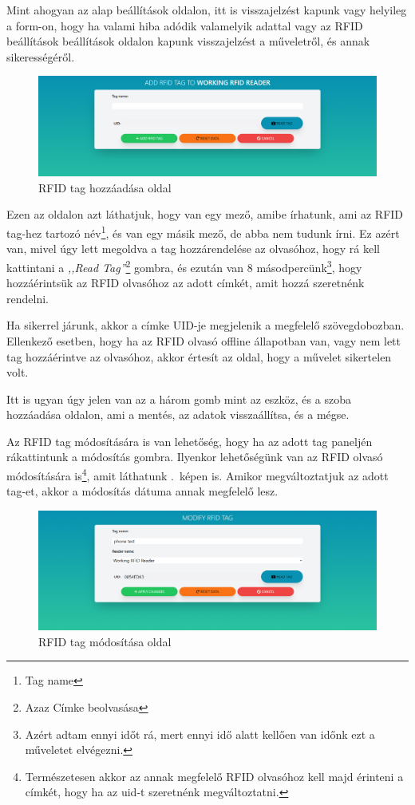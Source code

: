 \documentclass[
]{thesis-ekf}
\theoremstyle{definition}
\theoremstyle{remark}
\begin{document}
	Mint ahogyan az alap beállítások oldalon, itt is visszajelzést kapunk vagy helyileg a form-on, hogy ha valami hiba adódik valamelyik adattal vagy az RFID beállítások beállítások oldalon kapunk visszajelzést a műveletről, és annak sikerességéről.
	
	\begin{figure}[ht!]
		\centering
		\includegraphics[width=1\textwidth]{./src/pages_img/add-rfid-tag}
		\caption{RFID tag hozzáadása oldal}
		\label{add-rfid-tag}
	\end{figure}

	Ezen az oldalon azt láthatjuk, hogy van egy mező, amibe írhatunk, ami az RFID tag-hez tartozó név\footnote{Tag name}, és van egy másik mező, de abba nem tudunk írni. Ez azért van, mivel úgy lett megoldva a tag hozzárendelése az olvasóhoz, hogy rá kell kattintani a \emph{,,Read Tag''}\footnote{Azaz Címke beolvasása} gombra, és ezután van 8 másodpercünk\footnote{Azért adtam ennyi időt rá, mert ennyi idő alatt kellően van időnk ezt a műveletet elvégezni.}, hogy hozzáérintsük az RFID olvasóhoz az adott címkét, amit hozzá szeretnénk rendelni. 
	
	Ha sikerrel járunk, akkor a címke UID-je megjelenik a megfelelő szövegdobozban. Ellenkező esetben, hogy ha az RFID olvasó offline állapotban van, vagy nem lett tag hozzáérintve az olvasóhoz, akkor értesít az oldal, hogy a művelet sikertelen volt.
	
	Itt is ugyan úgy jelen van az a három gomb mint az eszköz, és a szoba hozzáadása oldalon, ami a mentés, az adatok visszaállítsa, és a mégse.
	
	Az RFID tag módosítására is van lehetőség, hogy ha az adott tag paneljén rákattintunk a módosítás gombra. Ilyenkor lehetőségünk van az RFID olvasó módosítására is\footnote{Természetesen akkor az annak megfelelő RFID olvasóhoz kell majd érinteni a címkét, hogy ha az uid-t szeretnénk megváltoztatni.}, amit láthatunk .~képen is. Amikor megváltoztatjuk az adott tag-et, akkor a módosítás dátuma annak megfelelő lesz.
	
	\begin{figure}[ht!]
		\centering
		\includegraphics[width=1\textwidth]{./src/pages_img/modify-rfid-tag}
		\caption{RFID tag módosítása oldal}
		\label{modify-rfid-tag}
	\end{figure}
\end{document}
